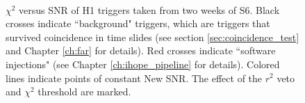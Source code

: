 \begin{figure}
\center
{} \\
\caption{$\chi^2$ versus SNR of H1 triggers taken from two weeks of S6. Black crosses indicate ``background" triggers, which are triggers that survived coincidence in time slides (see section \ref{sec:coincidence_test} and Chapter \ref{ch:far} for details). Red crosses indicate ``software injections" (see Chapter \ref{ch:ihope_pipeline} for details). Colored lines indicate points of constant New SNR. The effect of the $r^2$ veto and $\chi^2$ threshold are marked.}
\label{fig:snr_chisq}
\end{figure}


